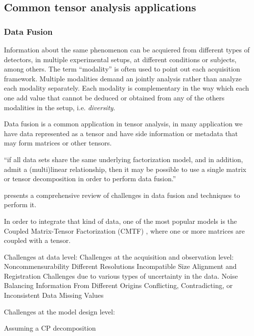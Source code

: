 \documentclass[letterpaper,12pt]{article}
\begin{document}
\subsection{Common tensor analysis applications}\label{sec:tensor_apps}


\subsubsection{Data Fusion}


Information about the same phenomenon can be acquiered from different types of detectors, in multiple experimental setups, at different  conditions or subjects, among others. The term ``modality'' is often used to point out each acquisition framework. Multiple modalities demand an jointly analysis rather than analyze each modality separately. Each modality is complementary in the way which each one add value that cannot be deduced or obtained from any of the others modalities in the setup, i.e. \textit{diversity}.

Data fusion is a common application in tensor analysis, in many application we have data represented as a tensor and have side information or metadata that may form matrices or other tensors.

``if all data sets share the same underlying factorization model, and in addition, admit a (multi)linear relationship, then it may be possible to use a single matrix or tensor decomposition in order to perform data fusion.'' \cite{Lahat2015}

\cite{Lahat2015} presents a comprehensive review of challenges in data fusion and techniques to perform it.

In order to integrate that kind of data, one of the most popular models is the Coupled Matrix-Tensor Factorization (CMTF) \cite{Acar2011}, where one or more matrices are coupled with a tensor.

Challenges at data level:
  Challenges at the acquisition and observation level:
    Noncommensurability
    Different Resolutions
    Incompatible Size
    Alignment and Registration
  Challenges due to various types of uncertainty in the data.
    Noise
    Balancing Information From Different Origins
    Conflicting, Contradicting, or Inconsistent Data
    Missing Values

Challenges at the model design level:
  

Assuming a CP decomposition
\end{document}
